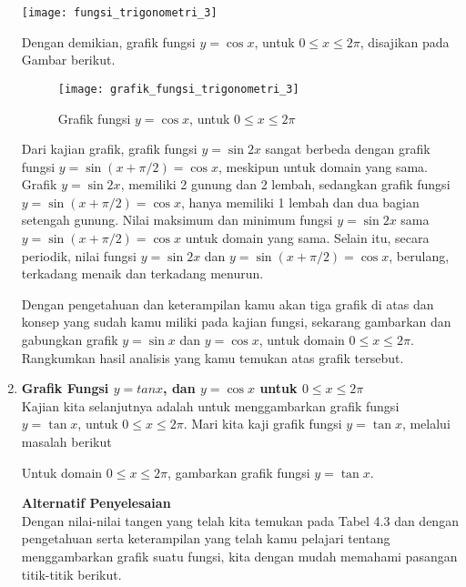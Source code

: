 \documentclass[11pt,fleqn]{book} %
\begin{document}
\begin{enumerate}
\begin{example}
\texttt{[image: fungsi\_trigonometri\_3]}

Dengan demikian, grafik fungsi $y = \cos x$, untuk $0 \leq x\leq 2\pi$, disajikan pada Gambar berikut.\\

\begin{figure}[!ht]
\begin{center}
\texttt{[image: grafik\_fungsi\_trigonometri\_3]} 
\caption{Grafik fungsi $y = \cos x$, untuk $0 \leq x\leq 2\pi$}
\end{center}
\end{figure}

Dari kajian grafik, grafik fungsi $y = \sin 2x$ sangat berbeda dengan grafik fungsi $y = \sin (x+\pi/2)  = \cos x$, meskipun untuk domain yang sama. Grafik $y = \sin 2x$, memiliki 2 gunung dan 2 lembah, sedangkan grafik fungsi $y = \sin (x+\pi/2)= \cos x$, hanya memiliki 1 lembah dan dua bagian setengah gunung. Nilai maksimum dan minimum fungsi $y = \sin 2x$ sama $y = \sin (x+\pi/2) = \cos x$ untuk domain yang sama. Selain itu, secara periodik, nilai fungsi $y = \sin 2x$ dan $y = \sin (x+\pi/2) = \cos x$, berulang, terkadang menaik dan terkadang menurun.
\end{example}
\begin{exercise}
Dengan pengetahuan dan keterampilan kamu akan tiga grafik di atas dan konsep yang sudah kamu miliki pada kajian fungsi, sekarang gambarkan dan gabungkan grafik $y = \sin x$ dan $y = \cos x$, untuk domain $0 \leq x\leq 2\pi$.\\
Rangkumkan hasil analisis yang kamu temukan atas grafik tersebut.
\end{exercise}
\item \textbf{Grafik Fungsi $y = tan x$, dan $y = \cos x$ untuk $0 \leq x\leq 2\pi$}\\
Kajian kita selanjutnya adalah untuk  menggambarkan grafik fungsi $y = \tan x$, untuk $0 \leq x\leq 2\pi$. Mari kita kaji grafik fungsi $y = \tan x$, melalui masalah berikut\\
\begin{problem}
Untuk domain $0 \leq x\leq 2\pi$, gambarkan grafik fungsi $y = \tan x$.\\
\end{problem}
\textbf{Alternatif Penyelesaian}\\
Dengan nilai-nilai tangen yang telah kita temukan pada Tabel 4.3 dan dengan pengetahuan serta keterampilan yang telah kamu pelajari tentang menggambarkan grafik suatu fungsi, kita dengan mudah memahami pasangan titik-titik berikut.\\


\end{enumerate}
\end{document}
